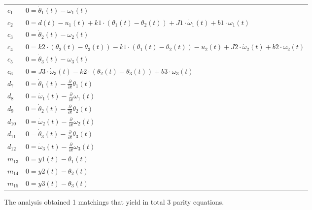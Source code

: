 \documentclass[a4,11pt]{article}
\begin{document}
\begin{longtable}{ l | p{} }
	$c_1$ & $ 0=\dot{\theta}_1\left(t\right)-\omega_1\left(t\right) $ \\
	$c_2$ & $ 0=d(t)-u_1\left(t\right)+k1\cdot \left(\theta_1\left(t\right)-\theta_2\left(t\right)\right)+J1\cdot \dot{\omega}_1\left(t\right)+b1\cdot \omega_1\left(t\right) $ \\
	$c_3$ & $ 0=\dot{\theta}_2\left(t\right)-\omega_2\left(t\right) $ \\
	$c_4$ & $ 0=k2\cdot \left(\theta_2\left(t\right)-\theta_3\left(t\right)\right)-k1\cdot \left(\theta_1\left(t\right)-\theta_2\left(t\right)\right)-u_2\left(t\right)+J2\cdot \dot{\omega}_2\left(t\right)+b2\cdot \omega_2\left(t\right) $ \\
	$c_5$ & $ 0=\dot{\theta}_3\left(t\right)-\omega_3\left(t\right) $ \\
	$c_6$ & $ 0=J3\cdot \dot{\omega}_3\left(t\right)-k2\cdot \left(\theta_2\left(t\right)-\theta_3\left(t\right)\right)+b3\cdot \omega_3\left(t\right) $ \\
	$d_7$ & $ 0=\dot{\theta}_1\left(t\right)-\frac{\partial }{\partial t} \theta_1\left(t\right) $ \\
	$d_8$ & $ 0=\dot{\omega}_1\left(t\right)-\frac{\partial }{\partial t} \omega_1\left(t\right) $ \\
	$d_9$ & $ 0=\dot{\theta}_2\left(t\right)-\frac{\partial }{\partial t} \theta_2\left(t\right) $ \\
	$d_{10}$ & $ 0=\dot{\omega}_2\left(t\right)-\frac{\partial }{\partial t} \omega_2\left(t\right) $ \\
	$d_{11}$ & $ 0=\dot{\theta}_3\left(t\right)-\frac{\partial }{\partial t} \theta_3\left(t\right) $ \\
	$d_{12}$ & $ 0=\dot{\omega}_3\left(t\right)-\frac{\partial }{\partial t} \omega_3\left(t\right) $ \\
	$m_{13}$ & $ 0=y1\left(t\right)-\theta_1\left(t\right) $ \\
	$m_{14}$ & $ 0=y2\left(t\right)-\theta_2\left(t\right) $ \\
	$m_{15}$ & $ 0=y3\left(t\right)-\theta_3\left(t\right) $ \\
\end{longtable}
The analysis obtained 1 matchings that yield in total 3 parity equations.\newpage
\end{document}
